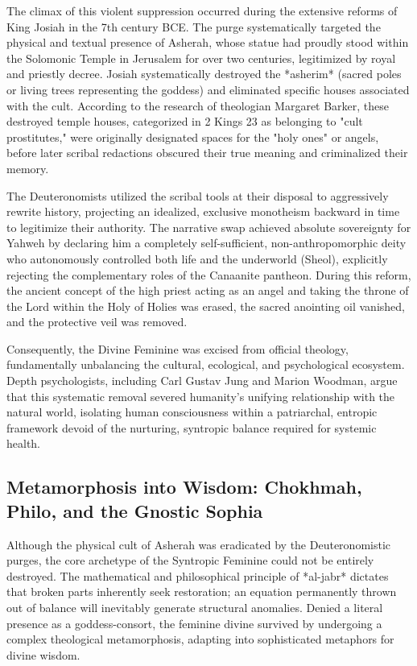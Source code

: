 \documentclass[aps,prd,11pt,onecolumn,superscriptaddress,nofootinbib,floatfix]{revtex4-2}
\begin{document}
The climax of this violent suppression occurred during the extensive reforms of King Josiah in the 7th century BCE. The purge systematically targeted the physical and textual presence of Asherah, whose statue had proudly stood within the Solomonic Temple in Jerusalem for over two centuries, legitimized by royal and priestly decree. Josiah systematically destroyed the *asherim* (sacred poles or living trees representing the goddess) and eliminated specific houses associated with the cult. According to the research of theologian Margaret Barker, these destroyed temple houses, categorized in 2 Kings 23 as belonging to "cult prostitutes," were originally designated spaces for the "holy ones" or angels, before later scribal redactions obscured their true meaning and criminalized their memory.


The Deuteronomists utilized the scribal tools at their disposal to aggressively rewrite history, projecting an idealized, exclusive monotheism backward in time to legitimize their authority. The narrative swap achieved absolute sovereignty for Yahweh by declaring him a completely self-sufficient, non-anthropomorphic deity who autonomously controlled both life and the underworld (Sheol), explicitly rejecting the complementary roles of the Canaanite pantheon. During this reform, the ancient concept of the high priest acting as an angel and taking the throne of the Lord within the Holy of Holies was erased, the sacred anointing oil vanished, and the protective veil was removed.


Consequently, the Divine Feminine was excised from official theology, fundamentally unbalancing the cultural, ecological, and psychological ecosystem. Depth psychologists, including Carl Gustav Jung and Marion Woodman, argue that this systematic removal severed humanity's unifying relationship with the natural world, isolating human consciousness within a patriarchal, entropic framework devoid of the nurturing, syntropic balance required for systemic health.


\subsection{Metamorphosis into Wisdom: Chokhmah, Philo, and the Gnostic Sophia}
Although the physical cult of Asherah was eradicated by the Deuteronomistic purges, the core archetype of the Syntropic Feminine could not be entirely destroyed. The mathematical and philosophical principle of *al-jabr* dictates that broken parts inherently seek restoration; an equation permanently thrown out of balance will inevitably generate structural anomalies. Denied a literal presence as a goddess-consort, the feminine divine survived by undergoing a complex theological metamorphosis, adapting into sophisticated metaphors for divine wisdom.
\end{document}
